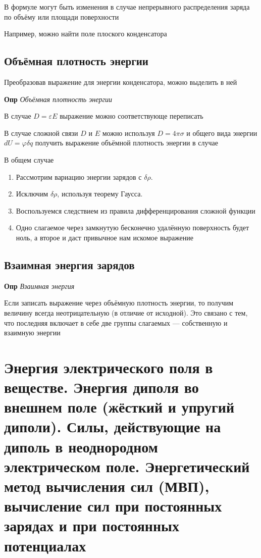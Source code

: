\documentclass[a4paper, 14pt]{article}
\begin{document}
    В формуле могут быть изменения в случае непрерывного распределения заряда по объёму или площади поверхности
    
    Например, можно найти поле плоского конденсатора
    
    \subsection{Объёмная плотность энергии}
    
    Преобразовав выражение для энергии конденсатора, можно выделить в ней
    
    \textbf{Опр} \textit{Объёмная плотность энергии}
    
    В случае $D = \varepsilon E$ выражение можно соответствующе переписать
    
    В случае сложной связи $D$ и $E$ можно используя $D = 4 \pi \sigma$ и общего вида энергии $dU = \varphi \delta q$ получить выражение
    объёмной плотность энергии в случае
    
    В общем случае
    
    \begin{enumerate}
        \item Рассмотрим вариацию энергии зарядов с $\delta \rho$.
        \item Исключим $\delta \rho$, используя теорему Гаусса.
        \item Воспользуемся следствием из правила дифференцирования сложной функции
        \item Одно слагаемое через замкнутую бесконечно удалённую поверхность будет ноль, а второе и даст привычное
        нам искомое выражение
    \end{enumerate}
    
    \subsection{Взаимная энергия зарядов}
    
    \textbf{Опр} \textit{Взаимная энергия}
    
    Если записать выражение через объёмную плотность энергии, то получим величину всегда неотрицательную (в отличие
    от исходной).
    Это связано с тем, что последняя включает в себе две группы слагаемых --- собственную и взаимную энергии
    
    \section{Энергия электрического поля в веществе.
    Энергия диполя во внешнем поле (жёсткий и упругий диполи).
    Силы, действующие на диполь в неоднородном электрическом поле.
    Энергетический метод вычисления сил (МВП), вычисление сил при постоянных зарядах и при постоянных потенциалах}
    
\end{document}
